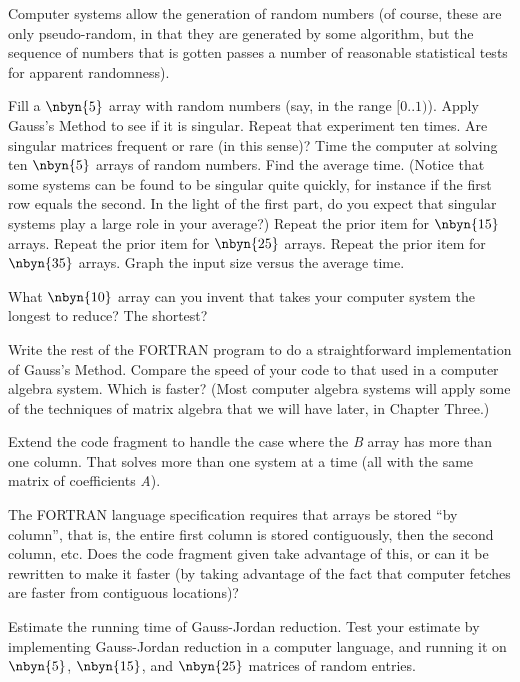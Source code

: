 \begin{exercises}
  \item Computer systems allow the generation of random numbers
    (of course, these are only pseudo-random, in that they are
    generated by some algorithm, but the sequence of numbers that is
    gotten passes a number of reasonable statistical tests for
    apparent randomness).
    \begin{exparts}
      \partsitem Fill a $\nbyn{5}$ array with random numbers (say, in the
        range $[0..1)$).
        Apply Gauss's Method to see if it is singular.
        Repeat that experiment ten times.
        Are singular matrices frequent or rare (in this sense)?
      \partsitem Time the computer at solving ten $\nbyn{5}$
        arrays of random numbers.
        Find the average time.
        (Notice that some systems can be found to be singular quite
        quickly, for instance if the first row equals the second.
        In the light of the first part, do you expect that 
        singular systems play a
        large role in your average?)
      \partsitem Repeat the prior item for $\nbyn{15}$ arrays.
      \partsitem Repeat the prior item for $\nbyn{25}$ arrays.
      \partsitem Repeat the prior item for $\nbyn{35}$ arrays.
      \partsitem Graph the input size versus the average time.
    \end{exparts}
  \item What $\nbyn{10}$ array can you invent that takes your computer
    system the longest to reduce?
    The shortest?
  \item Write the rest of the FORTRAN program to do a
    straightforward implementation of Gauss's Method.
    Compare the speed of your code to that used in a computer algebra
    system.
    Which is faster?
    (Most computer algebra systems will apply some of the techniques
    of matrix algebra that we will have later, in Chapter Three.)
  \item Extend the code fragment to handle the case where the \textit{B} array
    has more than one column.
    That solves more than one system at a time (all with the same
    matrix of coefficients \textit{A}). 
  \item The FORTRAN language specification requires that arrays be
    stored ``by column'', that is, the entire first column is stored
    contiguously, then the second column, etc.
    Does the code fragment given take advantage of this,
    or can it be rewritten to make it faster (by taking advantage of
    the fact that computer fetches are faster from contiguous locations)?
  \item Estimate the running time of Gauss-Jordan reduction.
    Test your estimate by implementing Gauss-Jordan reduction 
    in a computer language, and running it on $\nbyn{5}$, $\nbyn{15}$,
    and $\nbyn{25}$ matrices of random entries.
\end{exercises}
\endinput
